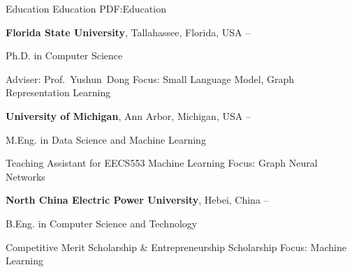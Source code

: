 \Section
{Education}
{Education}
{PDF:Education}

\Entry
{\textbf{Florida State University}},
Tallahassee, Florida, USA
\hfill
{} --

\Gap
\BulletItem
Ph.D. in
{Computer Science}
\begin{Detail}
\SubBulletItem
Adviser:
Prof.~Yushun~Dong
\SubBulletItem
Focus:
Small Language Model, Graph Representation Learning
\end{Detail}

\BigGap
\Entry
{\textbf{University of Michigan}},
Ann Arbor, Michigan, USA
\hfill
{} --

\Gap
\BulletItem
M.Eng. in
{Data Science and Machine Learning}
\begin{Detail}
\SubBulletItem
Teaching Assistant for EECS553 Machine Learning
\SubBulletItem
Focus: Graph Neural Networks
\end{Detail}

\BigGap
\Entry
{\textbf{North China Electric Power University}},
Hebei, China
\hfill
{} --

\Gap
\BulletItem
B.Eng. in
{Computer Science and Technology}
\begin{Detail}
\SubBulletItem
Competitive Merit Scholarship \& Entrepreneurship Scholarship
\SubBulletItem
Focus: Machine Learning
\end{Detail}


